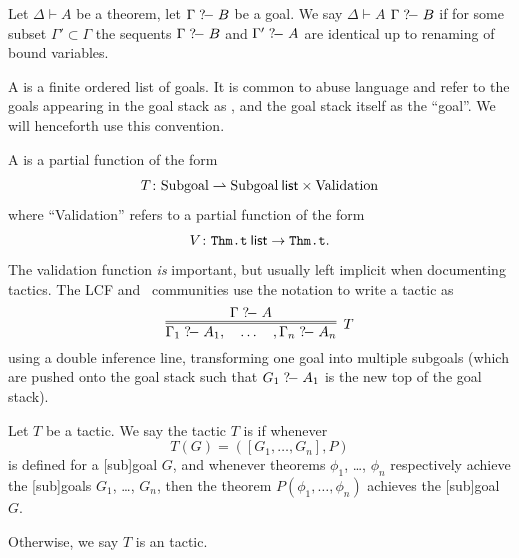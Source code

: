 \begin{definition}
Let $\Delta\vdash A$ be a theorem, let $\Gamma\mathrel{?\!-} B$ be a goal. We
say $\Delta\vdash A$  $\Gamma\mathrel{?\!-} B$ if for some
subset $\Gamma'\subset\Gamma$ the sequents $\Gamma\mathrel{?\!-} B$ and
$\Gamma'\mathrel{?\!-} A$ are identical up to renaming of bound variables.
\end{definition}

\begin{definition}
A  is a finite ordered list of goals. It is common
to abuse language and refer to the goals appearing in the goal stack
as , and the goal stack itself as the ``goal''. We
will henceforth use this convention.
\end{definition}

\begin{definition}
A  is a partial function of the form
\begin{equation}
T\colon\mbox{Subgoal}\rightharpoonup\mbox{Subgoal}\>\mbox{\sf list}\times\mbox{Validation}
\end{equation}
where ``Validation'' refers to a partial function of the form
\begin{equation}
V\colon\texttt{Thm.t}\>\mbox{\sf list}\to\mbox{\texttt{Thm.t}}.
\end{equation}
The validation function \emph{is} important, but usually left implicit
when documenting tactics.
The LCF and \HOL\ communities use the notation to write a tactic as
\begin{equation}
\vcenter{\infer=[T]{\Gamma_{1}\gdash A_{1},\quad\dots\quad,\Gamma_{n}\gdash A_{n}}{\Gamma\gdash A}}
\end{equation}
using a double inference line, transforming one goal into multiple
subgoals (which are pushed onto the goal stack such that $G_{1}\mathrel{?\!-} A_{1}$ is the new top of the goal stack).
\end{definition}

\begin{definition}
Let $T$ be a tactic. We say the tactic $T$ is  if whenever
\begin{equation}
T(G)=([G_{1},\dots,G_{n}], P)
\end{equation}
is defined for a [sub]goal $G$, and whenever theorems $\phi_{1}$,
\dots, $\phi_{n}$ respectively achieve the [sub]goals $G_{1}$, \dots, $G_{n}$,
then the theorem $P(\phi_{1},\dots,\phi_{n})$ achieves the [sub]goal $G$.

Otherwise, we say $T$ is an  tactic.
\end{definition}


